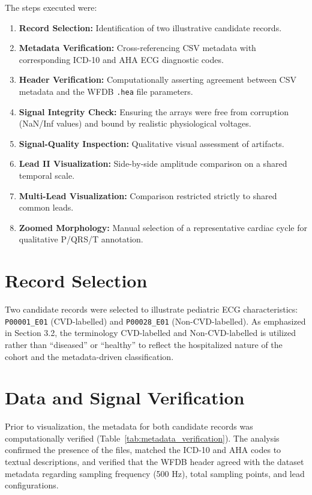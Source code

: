 \documentclass[11pt, a4paper]{article}
\begin{document}
The steps executed were:
\begin{enumerate}
    \item \textbf{Record Selection:} Identification of two illustrative candidate records.
    \item \textbf{Metadata Verification:} Cross-referencing CSV metadata with corresponding ICD-10 and AHA ECG diagnostic codes.
    \item \textbf{Header Verification:} Computationally asserting agreement between CSV metadata and the WFDB \texttt{.hea} file parameters.
    \item \textbf{Signal Integrity Check:} Ensuring the arrays were free from corruption (NaN/Inf values) and bound by realistic physiological voltages.
    \item \textbf{Signal-Quality Inspection:} Qualitative visual assessment of artifacts.
    \item \textbf{Lead II Visualization:} Side-by-side amplitude comparison on a shared temporal scale.
    \item \textbf{Multi-Lead Visualization:} Comparison restricted strictly to shared common leads.
    \item \textbf{Zoomed Morphology:} Manual selection of a representative cardiac cycle for qualitative P/QRS/T annotation.
\end{enumerate}

\section{Record Selection}
Two candidate records were selected to illustrate pediatric ECG characteristics: \texttt{P00001\_E01} (CVD-labelled) and \texttt{P00028\_E01} (Non-CVD-labelled). As emphasized in Section 3.2, the terminology CVD-labelled and Non-CVD-labelled is utilized rather than ``diseased'' or ``healthy'' to reflect the hospitalized nature of the cohort and the metadata-driven classification.

\section{Data and Signal Verification}
Prior to visualization, the metadata for both candidate records was computationally verified (Table~\ref{tab:metadata_verification}). The analysis confirmed the presence of the files, matched the ICD-10 and AHA codes to textual descriptions, and verified that the WFDB header agreed with the dataset metadata regarding sampling frequency (500 Hz), total sampling points, and lead configurations. 
\end{document}
